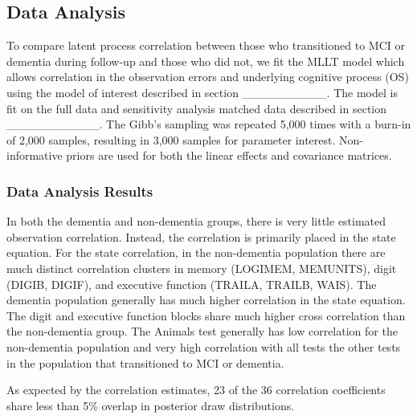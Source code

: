 \documentclass[
]{article}
\author{}
\date{\vspace{-2.5em}}
\begin{document}
\hypertarget{data-analysis}{%
\subsection{Data Analysis}\label{data-analysis}}

To compare latent process correlation between those who transitioned to MCI or dementia during follow-up and those who did not, we fit the MLLT model which allows correlation in the observation errors and underlying cognitive process (OS) using the model of interest described in section \_\_\_\_\_\_\_\_\_\_. The model is fit on the full data and sensitivity analysis matched data described in section \_\_\_\_\_\_\_\_\_\_\_. The Gibb's sampling was repeated 5,000 times with a burn-in of 2,000 samples, resulting in 3,000 samples for parameter interest. Non-informative priors are used for both the linear effects and covariance matrices.

\hypertarget{data-analysis-results}{%
\subsubsection{Data Analysis Results}\label{data-analysis-results}}

In both the dementia and non-dementia groups, there is very little estimated observation correlation. Instead, the correlation is primarily placed in the state equation. For the state correlation, in the non-dementia population there are much distinct correlation clusters in memory (LOGIMEM, MEMUNITS), digit (DIGIB, DIGIF), and executive function (TRAILA, TRAILB, WAIS). The dementia population generally has much higher correlation in the state equation. The digit and executive function blocks share much higher cross correlation than the non-dementia group. The Animals test generally has low correlation for the non-dementia population and very high correlation with all tests the other tests in the population that transitioned to MCI or dementia.

As expected by the correlation estimates, 23 of the 36 correlation coefficients share less than 5\% overlap in posterior draw distributions.

\begingroup\fontsize{7}{9}\selectfont
\end{document}
